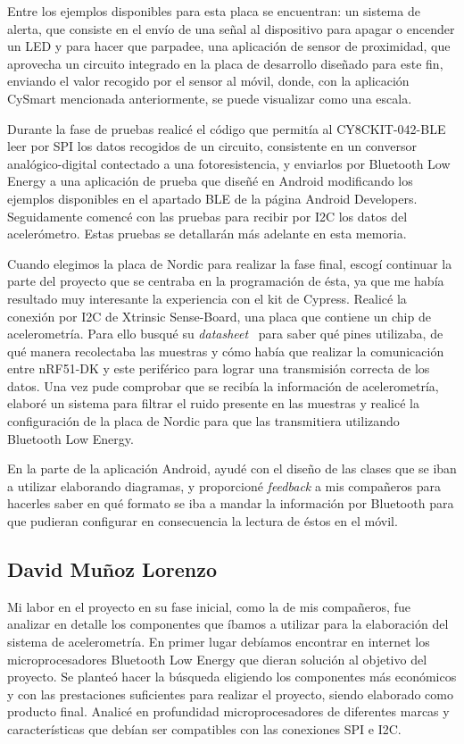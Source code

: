Entre los ejemplos disponibles para esta placa se encuentran: un sistema de alerta, que consiste en el envío de una señal al dispositivo para apagar o encender un LED y para hacer que parpadee, una aplicación de sensor de proximidad, que aprovecha un circuito integrado en la placa de desarrollo diseñado para este fin, enviando el valor recogido por el sensor al móvil, donde, con la aplicación CySmart mencionada anteriormente, se puede visualizar como una escala.

Durante la fase de pruebas realicé el código que permitía al CY8CKIT-042-BLE leer por SPI los datos recogidos de un circuito, consistente en un conversor analógico-digital contectado a una fotoresistencia, y enviarlos por Bluetooth Low Energy a una aplicación de prueba que diseñé en Android modificando los ejemplos disponibles en el apartado BLE de la página Android Developers. Seguidamente comencé con las pruebas para recibir por I2C los datos del acelerómetro. Estas pruebas se detallarán más adelante en esta memoria.

Cuando elegimos la placa de Nordic para realizar la fase final, escogí continuar la parte del proyecto que se centraba en la programación de ésta, ya que me había resultado muy interesante la experiencia con el kit de Cypress. Realicé la conexión por I2C de Xtrinsic Sense-Board, una placa que contiene un chip de acelerometría. Para ello busqué su \textit{datasheet}~\cite{DatasheetAcc} para saber qué pines utilizaba, de qué manera recolectaba las muestras y cómo había que realizar la comunicación entre nRF51-DK y este periférico para lograr una transmisión correcta de los datos. Una vez pude comprobar que se recibía la información de acelerometría, elaboré un sistema para filtrar el ruido presente en las muestras y realicé la configuración de la placa de Nordic para que las transmitiera utilizando Bluetooth Low Energy.

En la parte de la aplicación Android, ayudé con el diseño de las clases que se iban a utilizar elaborando diagramas, y proporcioné \textit{feedback} a mis compañeros para hacerles saber en qué formato se iba a mandar la información por Bluetooth para que pudieran configurar en consecuencia la lectura de éstos en el móvil.

\subsection{David Muñoz Lorenzo}

Mi labor en el proyecto en su fase inicial, como la de mis compañeros, fue analizar en detalle los componentes que íbamos a utilizar para la elaboración del sistema de acelerometría. En primer lugar debíamos encontrar en internet los microprocesadores Bluetooth Low Energy que dieran solución al objetivo del proyecto.
Se planteó hacer la búsqueda eligiendo los componentes más económicos y con las prestaciones suficientes para realizar el proyecto, siendo elaborado como producto final. Analicé en profundidad microprocesadores de diferentes marcas y características que debían ser compatibles con las conexiones SPI e I2C.

